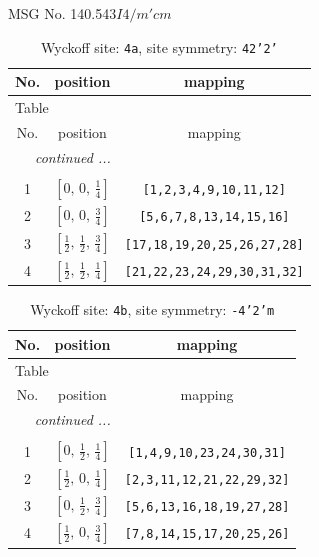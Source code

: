 \documentclass[fleqn,8pt]{jsarticle}
\begin{document}
\setcounter{MaxMatrixCols}{32}

\renewcommand{\tablename}{Table~}
\renewcommand{\figurename}{Figure~}
\begin{center}
\LARGE
MSG No. 140.543\quad$I4/m'cm$
\end{center}
\renewcommand{\arraystretch}{1.2}
\begin{longtable}{ccc}
\caption{Wyckoff site: {\tt 4a}, site symmetry: {\tt 42'2'}}
 \\
 \hline \hline
No. & position & mapping \\ \hline \endfirsthead

\multicolumn{2}{l}{\tablename\ \thetable{}} \\
 \hline \hline
No. & position & mapping \\ \hline \endhead

 \hline \hline
\multicolumn{2}{r}{\footnotesize\it continued ...} \\ \endfoot

 \hline \hline
\multicolumn{2}{r}{} \\ \endlastfoot

1 & $\left[ 0,\, 0,\, \frac{1}{4} \right]$ & {\tt [1,2,3,4,9,10,11,12]} \\ \hline
2 & $\left[ 0,\, 0,\, \frac{3}{4} \right]$ & {\tt [5,6,7,8,13,14,15,16]} \\ \hline
3 & $\left[ \frac{1}{2},\, \frac{1}{2},\, \frac{3}{4} \right]$ & {\tt [17,18,19,20,25,26,27,28]} \\ \hline
4 & $\left[ \frac{1}{2},\, \frac{1}{2},\, \frac{1}{4} \right]$ & {\tt [21,22,23,24,29,30,31,32]} \\
\end{longtable}
\renewcommand{\arraystretch}{1.2}
\begin{longtable}{ccc}
\caption{Wyckoff site: {\tt 4b}, site symmetry: {\tt -4'2'm}}
 \\
 \hline \hline
No. & position & mapping \\ \hline \endfirsthead

\multicolumn{2}{l}{\tablename\ \thetable{}} \\
 \hline \hline
No. & position & mapping \\ \hline \endhead

 \hline \hline
\multicolumn{2}{r}{\footnotesize\it continued ...} \\ \endfoot

 \hline \hline
\multicolumn{2}{r}{} \\ \endlastfoot

1 & $\left[ 0,\, \frac{1}{2},\, \frac{1}{4} \right]$ & {\tt [1,4,9,10,23,24,30,31]} \\ \hline
2 & $\left[ \frac{1}{2},\, 0,\, \frac{1}{4} \right]$ & {\tt [2,3,11,12,21,22,29,32]} \\ \hline
3 & $\left[ 0,\, \frac{1}{2},\, \frac{3}{4} \right]$ & {\tt [5,6,13,16,18,19,27,28]} \\ \hline
4 & $\left[ \frac{1}{2},\, 0,\, \frac{3}{4} \right]$ & {\tt [7,8,14,15,17,20,25,26]} \\
\end{longtable}
\end{document}
